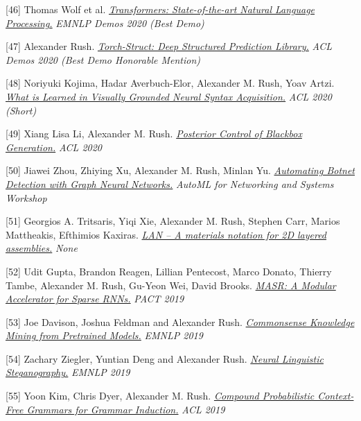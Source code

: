 \documentclass[10pt]{article}
\begin{document}
[46] \ind Thomas Wolf et al. \emph{\href{ https://arxiv.org/pdf/1910.03771 }{ Transformers: State-of-the-art Natural Language Processing.} }\emph{ EMNLP Demos 2020 (Best Demo) }

\medskip


[47] \ind Alexander Rush. \emph{\href{ https://arxiv.org/pdf/2002.00876 }{ Torch-Struct: Deep Structured Prediction Library.} }\emph{ ACL Demos 2020 (Best Demo Honorable Mention) }

\medskip


[48] \ind Noriyuki Kojima, Hadar Averbuch-Elor, Alexander M. Rush, Yoav Artzi. \emph{\href{ https://arxiv.org/pdf/2005.01678 }{ What is Learned in Visually Grounded Neural Syntax Acquisition.} }\emph{ ACL 2020  (Short) }

\medskip


[49] \ind Xiang Lisa Li, Alexander M. Rush. \emph{\href{ https://arxiv.org/pdf/2005.04560 }{ Posterior Control of Blackbox Generation.} }\emph{ ACL 2020 }

\medskip


[50] \ind Jiawei Zhou, Zhiying Xu, Alexander M. Rush, Minlan Yu. \emph{\href{ https://arxiv.org/pdf/2003.06344 }{ Automating Botnet Detection with Graph Neural Networks.} }\emph{ AutoML for Networking and Systems Workshop }

\medskip


[51] \ind Georgios A. Tritsaris, Yiqi Xie, Alexander M. Rush, Stephen Carr, Marios Mattheakis, Efthimios Kaxiras. \emph{\href{ https://arxiv.org/pdf/1910.03413 }{ LAN -- A materials notation for 2D layered assemblies.} }\emph{ None }

\medskip


[52] \ind Udit Gupta, Brandon Reagen, Lillian Pentecost, Marco Donato, Thierry Tambe, Alexander M. Rush, Gu-Yeon Wei, David Brooks. \emph{\href{ None }{ MASR: A Modular Accelerator for Sparse RNNs.} }\emph{ PACT 2019 }

\medskip


[53] \ind Joe Davison, Joshua Feldman and Alexander Rush. \emph{\href{ None }{ Commonsense Knowledge Mining from Pretrained Models.} }\emph{ EMNLP 2019 }

\medskip


[54] \ind Zachary Ziegler, Yuntian Deng and Alexander Rush. \emph{\href{ https://arxiv.org/abs/1909.01496 }{ Neural Linguistic Steganography.} }\emph{ EMNLP 2019 }

\medskip


[55] \ind Yoon Kim,  Chris Dyer, Alexander M. Rush. \emph{\href{ https://www.aclweb.org/anthology/P19-1228/ }{ Compound Probabilistic Context-Free Grammars for Grammar Induction.} }\emph{ ACL 2019 }
\end{document}
